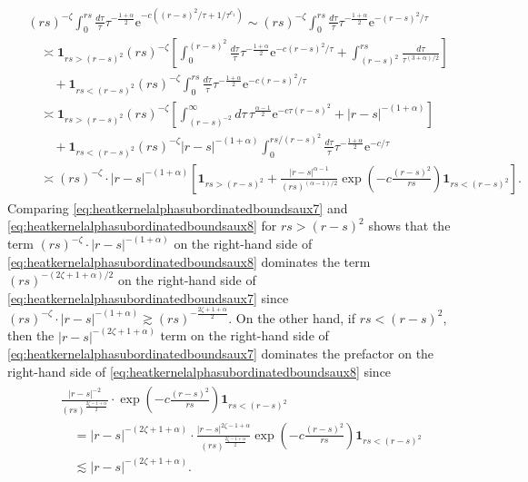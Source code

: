 \documentclass[12pt,reqno,a4paper]{amsart}
\theoremstyle{definition}
\theoremstyle{remark}
\numberwithin{equation}{section}
\newcommand{\1}{\mathbbm{1}}
\newcommand{\me}[1]{\mathrm{e}^{#1}}
\newcommand{\one}{\mathbf{1}}
\begin{document}
\begin{align}
  \label{eq:heatkernelalphasubordinatedboundsaux8}
  \begin{split}
    & (rs)^{-\zeta}\int_{0}^{rs} \frac{d\tau}{\tau} \tau^{-\frac{1+\alpha}{2}} \me{-c((r-s)^2/\tau+1/\tau^{c_1})}
    \sim (rs)^{-\zeta} \int_0^{rs} \frac{d\tau}{\tau} \tau^{-\frac{1+\alpha}{2}}\me{-(r-s)^2/\tau} \\
    & \quad \asymp \one_{rs>(r-s)^2}(rs)^{-\zeta}\left[\int_0^{(r-s)^2}\frac{d\tau}{\tau} \tau^{-\frac{1+\alpha}{2}} \me{-c(r-s)^2/\tau} + \int_{(r-s)^2}^{rs}\frac{d\tau}{\tau^{(3+\alpha)/2}}\right] \\
    & \qquad + \one_{rs<(r-s)^2}(rs)^{-\zeta}\int_0^{rs} \frac{d\tau}{\tau} \tau^{-\frac{1+\alpha}{2}} \me{-c(r-s)^2/\tau}\\
    & \quad \asymp \one_{rs>(r-s)^2}(rs)^{-\zeta}\left[\int_{(r-s)^{-2}}^\infty d\tau\, \tau^{\frac{\alpha-1}{2}} \me{-c\tau(r-s)^2} + |r-s|^{-(1+\alpha)}\right] \\
    & \qquad + \one_{rs<(r-s)^2}(rs)^{-\zeta} |r-s|^{-(1+\alpha)} \int_0^{rs/(r-s)^2} \frac{d\tau}{\tau} \tau^{-\frac{1+\alpha}{2}}\me{-c/\tau} \\
    & \quad \asymp (rs)^{-\zeta}\cdot |r-s|^{-(1+\alpha)} \left[\one_{rs>(r-s)^2} + \frac{|r-s|^{\alpha-1}}{(rs)^{(\alpha-1)/2}}\exp\left(-c\frac{(r-s)^2}{rs}\right)\one_{rs<(r-s)^2}\right].
  \end{split}
\end{align}
Comparing \eqref{eq:heatkernelalphasubordinatedboundsaux7} and \eqref{eq:heatkernelalphasubordinatedboundsaux8} for $rs>(r-s)^2$ shows that the term $(rs)^{-\zeta}\cdot|r-s|^{-(1+\alpha)}$ on the right-hand side of \eqref{eq:heatkernelalphasubordinatedboundsaux8} dominates the term $(rs)^{-(2\zeta+1+\alpha)/2}$ on the right-hand side of \eqref{eq:heatkernelalphasubordinatedboundsaux7} since $(rs)^{-\zeta}\cdot|r-s|^{-(1+\alpha)}\gtrsim (rs)^{-\frac{2\zeta+1+\alpha}{2}}$. On the other hand, if $rs<(r-s)^2$, then the $|r-s|^{-(2\zeta+1+\alpha)}$ term on the right-hand side of \eqref{eq:heatkernelalphasubordinatedboundsaux7} dominates the prefactor on the right-hand side of \eqref{eq:heatkernelalphasubordinatedboundsaux8} since
\begin{align}
  \begin{split}
    & \frac{|r-s|^{-2}}{(rs)^{\frac{2\zeta-1+\alpha}{2}}}\cdot\exp\left(-c\frac{(r-s)^2}{rs}\right)\one_{rs<(r-s)^2} \\
    & \quad = |r-s|^{-(2\zeta+1+\alpha)} \cdot \frac{|r-s|^{2\zeta-1+\alpha}}{(rs)^{\frac{2\zeta-1+\alpha}{2}}} \exp\left(-c\frac{(r-s)^2}{rs}\right)\one_{rs<(r-s)^2} \\
    & \quad \lesssim |r-s|^{-(2\zeta+1+\alpha)}.
  \end{split}
\end{align}
\end{document}
